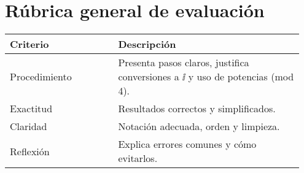 
\section*{Rúbrica general de evaluación}
\begin{tabular}{p{0.35\linewidth} p{0.6\linewidth}}
\toprule
\textbf{Criterio} & \textbf{Descripción} \\
\midrule
Procedimiento & Presenta pasos claros, justifica conversiones a \(\ii\) y uso de potencias (mod 4). \\
Exactitud & Resultados correctos y simplificados. \\
Claridad & Notación adecuada, orden y limpieza. \\
Reflexión & Explica errores comunes y cómo evitarlos. \\
\bottomrule
\end{tabular}